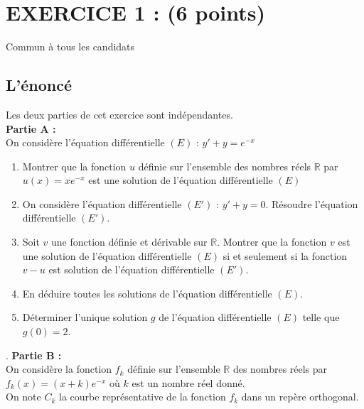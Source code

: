 \documentclass[a4paper,11pt]{book}
\newcommand{\R}{{\mathbb{R}}}
\begin{document}
\section{ EXERCICE 1 : (6 points)}
Commun  \`a  tous les candidats
\subsection{L'\'enonc\'e}
Les deux parties de cet exercice sont ind\'ependantes.\\
{\bf Partie A :}\\
On consid\`ere l'\'equation diff\'erentielle $(E)$ : $y'+y=e^{-x}$ 
\begin{enumerate}  
\item Montrer que la fonction $u$ d\'efinie sur l'ensemble des nombres r\'eels 
$\R$ par $u(x)=xe^{-x}$ est une solution de l'\'equation diff\'erentielle $(E)$
\item On consid\`ere l'\'equation diff\'erentielle $(E')$ : $y'+y=0$. 
R\'esoudre l'\'equation diff\'erentielle $(E')$.
\item Soit $v$ une fonction d\'efinie et d\'erivable sur $\R$. Montrer que la 
fonction $v$ est une solution de l'\'equation diff\'erentielle $(E)$ si et 
seulement si la fonction $v-u$ est solution de l'\'equation diff\'erentielle 
$(E')$.
\item En d\'eduire toutes les solutions de l'\'equation diff\'erentielle $(E)$.
\item D\'eterminer l'unique solution $g$ de l'\'equation diff\'erentielle $(E)$
 telle que $g(0)=2$. 
\end{enumerate}    
       .
{\bf Partie B :}\\
On consid\`ere la fonction $f_k$ d\'efinie sur l'ensemble $\R$ des nombres 
r\'eels par $f_k(x)=(x+k)e^{-x}$ o\`u $k$ est un nombre r\'eel donn\'e.\\
On note $C_k$ la courbe repr\'esentative de la fonction $f_k$ dans un rep\`ere 
orthogonal.
\end{document}
